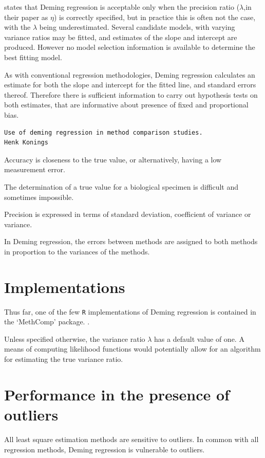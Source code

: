 \documentclass[12pt, a4paper]{report}
\theoremstyle{plain}
\theoremstyle{definition}
\theoremstyle{remark}
\begin{document}
\citet{CarollRupert} states that Deming
regression is acceptable only when the precision ratio ($\lambda$,in their paper as $\eta$) is correctly specified, but in practice this is often not the case, with the $\lambda$ being underestimated. Several candidate models, with varying variance ratios may be fitted, and estimates of the slope and intercept are produced. However no model selection information is available to determine the best fitting model.

As with conventional regression methodologies, Deming regression calculates an estimate for both the slope and intercept for the
fitted line, and standard errors thereof. Therefore there is sufficient information to carry out hypothesis tests on both
estimates, that are informative about presence of fixed and proportional bias.



\begin{verbatim}
Use of deming regression in method comparison studies.
Henk Konings
\end{verbatim}

Accuracy is closeness to the true value, or alternatively, having a low measurement error.

The determination of a true value for a biological specimen is difficult and sometimes impossible.

Precision is expressed in terms of standard deviation, coefficient of variance or variance.

In Deming regression, the errors between methods are assigned to both methods in proportion to the variances of the methods.





\section{Implementations}
Thus far, one of the few \texttt{R} implementations of Deming regression is contained in the `MethComp' package. \citep{BXC2008}.

Unless specified otherwise, the variance ratio $\lambda$ has a default value of one. A means of computing likelihood functions would potentially allow for an algorithm for estimating the true variance ratio.


\section{Performance in the presence of outliers}
All least square estimation methods are sensitive to outliers.
In common with all regression methods, Deming regression is vulnerable to outliers. 
\end{document}

